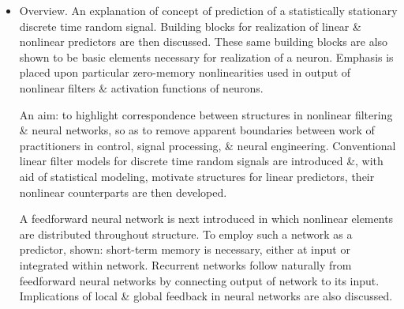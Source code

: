 \documentclass{article}
\begin{document}
\begin{enumerate}
\begin{itemize}
\begin{itemize}
			From a biological perspective (Marmarelis 1989), {\it prototypical} neuron is composed of a cell body (soma), a tree-like element of fibres (dendrites) \& a long fibre (axon) with sparse branches (collaterals). Axon is attached to soma at the {\it axon hillock}, \&, together with its collaterals, ends at synaptic terminals (boutons), which are employed to pass information onto their neurons through {\it synaptic junctions}. Soma contains nucleus \& is attached to trunk of dendritic tree from which it receives incoming information. Dendrites are conductors of input information to soma, i.e. input ports, \& usually exhibit a high degree of arborisation.
			
			Possible architectures for nonlinear filters or neural networks are manifold. State-space representation from system theory is established for linear systems (Kailath 1980; Kailath et al. 2000) \& provides a mechanism for representation of structural variants. An insightful canonical form for neural networks is provided by Nerrand et al. (1993), by exploitation of state-space representation which facilitates a unified treatment of architectures of neural networks.\footnote{ARMA models also have a canonical (up to an invariant) representation.}
			\item {\sf Overview.} An explanation of concept of prediction of a statistically stationary discrete time random signal. Building blocks for realization of linear \& nonlinear predictors are then discussed. These same building blocks are also shown to be basic elements necessary for realization of a neuron. Emphasis is placed upon particular zero-memory nonlinearities used in output of nonlinear filters \& activation functions of neurons.
			
			An aim: to highlight correspondence between structures in nonlinear filtering \& neural networks, so as to remove apparent boundaries between work of practitioners in control, signal processing, \& neural engineering. Conventional linear filter models for discrete time random signals are introduced \&, with aid of statistical modeling, motivate structures for linear predictors, their nonlinear counterparts are then developed.
			
			A feedforward neural network is next introduced in which nonlinear elements are distributed throughout structure. To employ such a network as a predictor, shown: short-term memory is necessary, either at input or integrated within network. Recurrent networks follow naturally from feedforward neural networks by connecting output of network to its input. Implications of local \& global feedback in neural networks are also discussed.
			

\end{itemize}
\end{itemize}
\end{enumerate}
\end{document}
